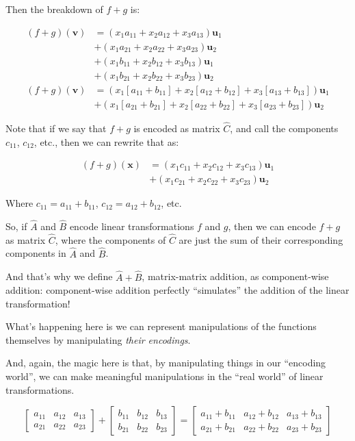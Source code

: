 \documentclass[]{article}
\begin{document}
Then the breakdown of \(f + g\) is:

\[
\begin{aligned}
(f + g)(\mathbf{v}) & = (x_1 a_{11} + x_2 a_{12} + x_3 a_{13}) \mathbf{u}_1 \\
                    & + (x_1 a_{21} + x_2 a_{22} + x_3 a_{23}) \mathbf{u}_2 \\
                    & + (x_1 b_{11} + x_2 b_{12} + x_3 b_{13}) \mathbf{u}_1 \\
                    & + (x_1 b_{21} + x_2 b_{22} + x_3 b_{23}) \mathbf{u}_2 \\
(f + g)(\mathbf{v}) & = (x_1 [a_{11} + b_{11}] + x_2 [a_{12} + b_{12}] + x_3 [a_{13} + b_{13}]) \mathbf{u}_1 \\
                    & + (x_1 [a_{21} + b_{21}] + x_2 [a_{22} + b_{22}] + x_3 [a_{23} + b_{23}]) \mathbf{u}_2
\end{aligned}
\]

Note that if we say that \(f + g\) is encoded as matrix \(\hat{C}\), and call
the components \(c_{11}\), \(c_{12}\), etc., then we can rewrite that as:

\[
\begin{aligned}
(f + g)(\mathbf{x}) & = (x_1 c_{11} + x_2 c_{12} + x_3 c_{13}) \mathbf{u}_1 \\
                    & + (x_1 c_{21} + x_2 c_{22} + x_3 c_{23}) \mathbf{u}_2
\end{aligned}
\]

Where \(c_{11} = a_{11} + b_{11}\), \(c_{12} = a_{12} + b_{12}\), etc.

So, if \(\hat{A}\) and \(\hat{B}\) encode linear transformations \(f\) and
\(g\), then we can encode \(f + g\) as matrix \(\hat{C}\), where the components
of \(\hat{C}\) are just the sum of their corresponding components in \(\hat{A}\)
and \(\hat{B}\).

And that's why we define \(\hat{A} + \hat{B}\), matrix-matrix addition, as
component-wise addition: component-wise addition perfectly ``simulates'' the
addition of the linear transformation!

What's happening here is we can represent manipulations of the functions
themselves by manipulating \emph{their encodings}.

And, again, the magic here is that, by manipulating things in our ``encoding
world'', we can make meaningful manipulations in the ``real world'' of linear
transformations.

\[
\begin{bmatrix}
a_{11} & a_{12} & a_{13} \\
a_{21} & a_{22} & a_{23}
\end{bmatrix}
+
\begin{bmatrix}
b_{11} & b_{12} & b_{13} \\
b_{21} & b_{22} & b_{23}
\end{bmatrix}
=
\begin{bmatrix}
a_{11}+b_{11} & a_{12}+b_{12} & a_{13}+b_{13} \\
a_{21}+b_{21} & a_{22}+b_{22} & a_{23}+b_{23}
\end{bmatrix}
\]
\end{document}
